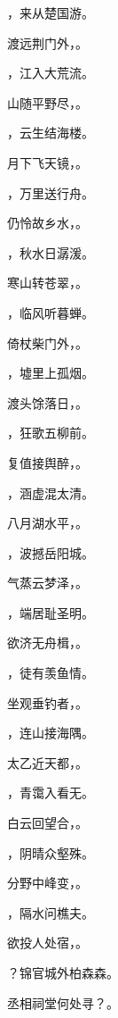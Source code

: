 \documentclass[12pt, a4paper, addpoints, answers]{exam}
\begin{document}
\begin{questions}
\question[3] \fillin ，来从楚国游。

\question[3] 渡远荆门外，\fillin 。

\question[3] \fillin ，江入大荒流。

\question[3] 山随平野尽，\fillin 。

\question[3] \fillin ，云生结海楼。

\question[3] 月下飞天镜，\fillin 。

\question[3] \fillin ，万里送行舟。

\question[3] 仍怜故乡水，\fillin 。

\question[3] \fillin ，秋水日潺湲。

\question[3] 寒山转苍翠，\fillin 。

\question[3] \fillin ，临风听暮蝉。

\question[3] 倚杖柴门外，\fillin 。

\question[3] \fillin ，墟里上孤烟。

\question[3] 渡头馀落日，\fillin 。

\question[3] \fillin ，狂歌五柳前。

\question[3] 复值接舆醉，\fillin 。

\question[3] \fillin ，涵虚混太清。

\question[3] 八月湖水平，\fillin 。

\question[3] \fillin ，波撼岳阳城。

\question[3] 气蒸云梦泽，\fillin 。

\question[3] \fillin ，端居耻圣明。

\question[3] 欲济无舟楫，\fillin 。

\question[3] \fillin ，徒有羡鱼情。

\question[3] 坐观垂钓者，\fillin 。

\question[3] \fillin ，连山接海隅。

\question[3] 太乙近天都，\fillin 。

\question[3] \fillin ，青霭入看无。

\question[3] 白云回望合，\fillin 。

\question[3] \fillin ，阴晴众壑殊。

\question[3] 分野中峰变，\fillin 。

\question[3] \fillin ，隔水问樵夫。

\question[3] 欲投人处宿，\fillin 。

\question[3] \fillin ？锦官城外柏森森。

\question[3] 丞相祠堂何处寻？\fillin 。


\end{questions}
\end{document}
